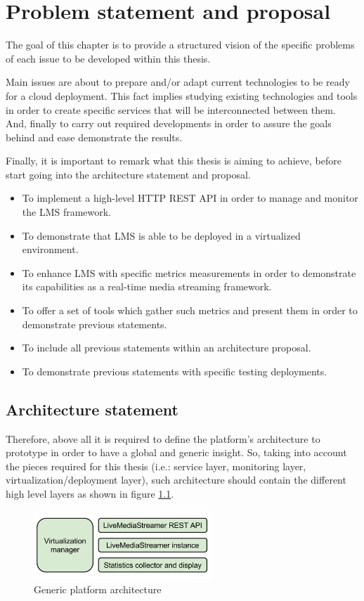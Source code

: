 \chapter{Problem statement and proposal}\label{B:problemStatementAndProposal}

The goal of this chapter is to provide a structured vision of the specific problems of each issue to be developed within this thesis.

Main issues are about to prepare and/or adapt current technologies to be ready for a cloud deployment. This fact implies studying existing technologies and tools in order to create specific services that will be interconnected between them. And, finally to carry out required developments in order to assure the goals behind and ease demonstrate the results.

Finally, it is important to remark what this thesis is aiming to achieve, before start going into the architecture statement and proposal.

\begin{itemize}
\item To implement a high-level HTTP REST API in order to manage and monitor the LMS framework.
\item To demonstrate that LMS is able to be deployed in a virtualized environment.
\item To enhance LMS with specific metrics measurements in order to demonstrate its capabilities as a real-time media streaming framework.
\item To offer a set of tools which gather such metrics and present them in order to demonstrate previous statements.
\item To include all previous statements within an architecture proposal.
\item To demonstrate previous statements with specific testing deployments.
\end{itemize}

\section{Architecture statement}

Therefore, above all it is required to define the platform's architecture to prototype in order to have a global and generic insight. So, taking into account the pieces required for this thesis (i.e.: service layer, monitoring layer, virtualization/deployment layer), such architecture should contain the different high level layers as shown in figure \ref{F:genericPlatArch}.
\begin{figure}[htb]
\begin{center}
\includegraphics[width=0.6\textwidth]{./images/generalArch.png}
\caption{Generic platform architecture}
\label{F:genericPlatArch}
\end{center}
\end{figure}

